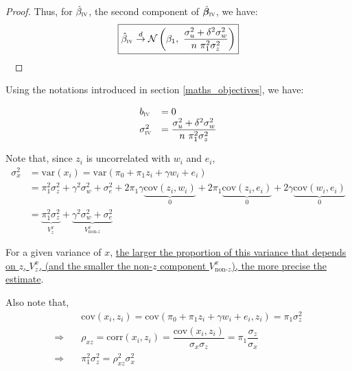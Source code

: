 \documentclass[a4paper, 11pt]{report}
\begin{document}
\begin{proof}
			Thus, for $\hat{\beta}_{\textsc{iv}}$, the second component of $\hat{\bm{\beta}}_{\textsc{iv}}$, we have:
				\begin{equation}
					\boxed{
						\hat{\beta}_{\textsc{iv}} \overset{d}{\to}
							 \mathcal{N}\left( \beta_1 , \ \dfrac{\sigma_{u}^{2} + \delta^{2}\sigma_{w}^{2}}{n \ \pi_{1}^{2}\sigma_{z}^{2}} \right) 
					}
				\end{equation}
				~
		\end{proof}
				
				Using the notations introduced in section \ref{maths_objectives}, we have:
				~
				
				\begin{equation}\label{b_sigma_iv}
					\begin{array}{lll}
						b_{\textsc{iv}} & = 0\\
					\sigma_{\textsc{iv}}^{2} & = \dfrac{\sigma_{u}^{2} + \delta^{2}\sigma_{w}^{2}}{n \ \pi_{1}^{2}\sigma_{z}^{2}}
					\end{array}				
				\end{equation}
				
				Note that, since $z_{i}$ is uncorrelated with $w_{i}$ and $e_{i}$, 
				~
				\begin{align*}
					\sigma_{x}^{2} & =  \text{var}(x_{i}) = \text{var}(\pi_{0} + \pi_{1}z_{i} + \gamma w_{i} + e_{i})\\
						& = \pi_{1}^{2}\sigma_{z}^{2} + \gamma^{2}\sigma_{w}^{2} + \sigma_{e}^{2} + 2\pi_{1}\gamma \underbrace{\text{cov}(z_{i}, w_{i})}_{0} + 2 \pi_{1}  \underbrace{\text{cov}(z_{i}, e_{i})}_{0} + 2\gamma \underbrace{\text{cov}(w_{i}, e_{i})}_{0} \\
						& = \underbrace{\pi_{1}^{2}\sigma_{z}^{2}}_{V_{z}^{x}} + \underbrace{\gamma^{2}\sigma_{w}^{2} + \sigma_{e}^{2}}_{V_{\text{non-}z}^{x}}
				\end{align*}
				
				For a given variance of $x$, \ul{the larger the proportion of this variance that depends on $z$, $V_{z}^{x}$, (and the smaller the non-$z$ component $V_{\text{non-}z}^{x}$), the more precise the estimate}.
				
				Also note that,
				~
				\begin{align*}
					 &\text{cov}(x_i , z_i) =  \text{cov}( \pi_0 + \pi_1 z_i + \gamma w_{i} + e_{i} , z_i) = \pi_1 \sigma_{z}^{2}\\
					\Rightarrow \quad & 
					 \rho_{xz} = \text{corr}(x_{i}, z_{i}) = \dfrac{\text{cov}(x_{i}, z_{i})}{\sigma_x \sigma_z} = \pi_1 \dfrac{\sigma_z}{\sigma_x}\\
					\Rightarrow \quad & \pi_1^{2} \sigma_z^{2} = \rho_{xz}^{2}\sigma_{x}^{2}
				\end{align*}
				
\end{document}
